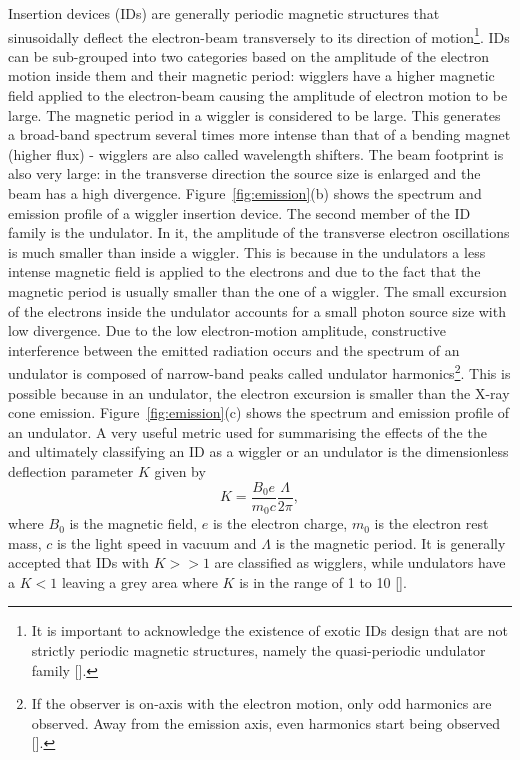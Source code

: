 \begin{refsection}
Insertion devices (IDs) are generally periodic magnetic structures that sinusoidally deflect the electron-beam transversely to its direction of motion\footnote{It is important to acknowledge the existence of exotic IDs design that are not strictly periodic magnetic structures, namely the quasi-periodic undulator family [\cite[\textit{§7.2}]{Elleaume2013}].}. IDs can be sub-grouped into two categories based on the amplitude of the electron motion inside them and their magnetic period: wigglers have a higher magnetic field applied to the electron-beam causing the amplitude of electron motion to be large. The magnetic period in a wiggler is considered to be large. This generates a broad-band spectrum several times more intense than that of a bending magnet (higher flux) - wigglers are also called wavelength shifters. The beam footprint is also very large: in the transverse direction the source size is enlarged and the beam has a high divergence. Figure~\ref{fig:emission}(b) shows the spectrum and emission profile of a wiggler insertion device. The second member of the ID family is the undulator. In it, the amplitude of the transverse electron oscillations is much smaller than inside a wiggler. This is because in the undulators a less intense magnetic field is applied to the electrons and due to the fact that the magnetic period is usually smaller than the one of a wiggler. The small excursion of the electrons inside the undulator accounts for a small photon source size with low divergence. Due to the low electron-motion amplitude, constructive interference between the emitted radiation occurs and the spectrum of an undulator is composed of narrow-band peaks called undulator harmonics\footnote{If the observer is on-axis with the electron motion, only odd harmonics are observed. Away from the emission axis, even harmonics start being observed [\cite[\textit{§4.2}]{Clarke2004}].}. This is possible because in an undulator, the electron excursion is smaller than the X-ray cone emission. Figure~\ref{fig:emission}(c) shows the spectrum and emission profile of an undulator. A very useful metric used for summarising the effects of the  the  and ultimately classifying an ID as a wiggler or an undulator is the dimensionless deflection parameter $K$ given by
\begin{equation}
    K=\frac{B_0e}{m_0c}\frac{\Lambda}{2\pi},
\end{equation}
where $B_0$ is the magnetic field, $e$ is the electron charge, $m_0$ is the electron rest mass, $c$ is the light speed in vacuum and $\Lambda$ is the magnetic period. It is generally accepted that IDs with $K>>1$ are classified as wigglers, while undulators have a $K<1$ leaving a grey area where $K$ is in the range of 1 to 10 [\cite[§3.1]{Elleaume2013}].


\end{refsection}
